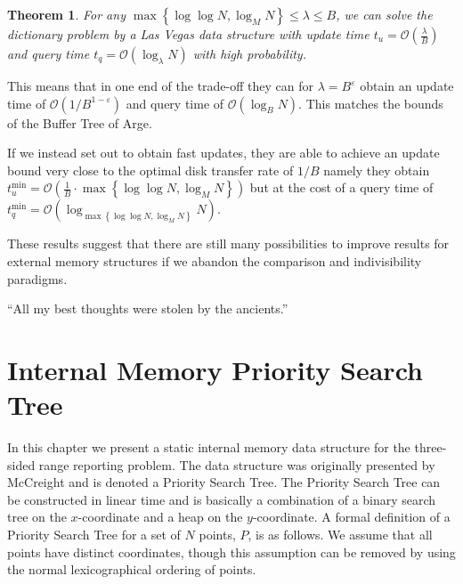 \documentclass[twoside,11pt,openright]{report}
\def \epsilon {\varepsilon}
\newtheorem{theorem}{Theorem}
\begin{document}
\begin{theorem}
For any $\max\left\lbrace \log\log N, \log_M N \right\rbrace \leq \lambda \leq B$, we can solve the dictionary problem by a Las Vegas data structure with update time $t_u = \mathcal{O}(\frac{\lambda}{B})$ and query time $t_q = \mathcal{O}(\log_\lambda N)$ with high probability.
\end{theorem}

This means that in one end of the trade-off they can for $\lambda = B^\epsilon$ obtain an update time of $\mathcal{O}(1/B^{1-\epsilon})$ and query time of $\mathcal{O}(\log_B N)$. This matches the bounds of the Buffer Tree of Arge. 

If we instead set out to obtain fast updates, they are able to achieve an update bound very close to the optimal disk transfer rate of $1/B$ namely they obtain $t_u^{\min} = \mathcal{O}(\frac{1}{B} \cdot \max\left\lbrace \log\log N, \log_M N \right\rbrace)$ but at the cost of a query time of $t_q^{\min} = \mathcal{O}\left(\log_{\max\left\lbrace \log\log N, \log_M N \right\rbrace} N\right)$.

These results suggest that there are still many possibilities to improve results for external memory structures if we abandon the comparison and indivisibility paradigms.

\begin{savequote}[0.5\textwidth]
``All my best thoughts were stolen by the ancients.''
\end{savequote}
\chapter{Internal Memory Priority Search Tree}
\label{chp:internal_pst}
In this chapter we present a static internal memory data structure for the three-sided range reporting problem. The data structure was originally presented by McCreight \cite{DBLP:journals/siamcomp/McCreight85} and is denoted a Priority Search Tree. The Priority Search Tree can be constructed in linear time and is basically a combination of a binary search tree on the $x$-coordinate and a heap on the $y$-coordinate. A formal definition of a Priority Search Tree for a set of $N$ points, $P$, is as follows. We assume that all points have distinct coordinates, though this assumption can be removed by using the normal lexicographical ordering of points.
\end{document}
